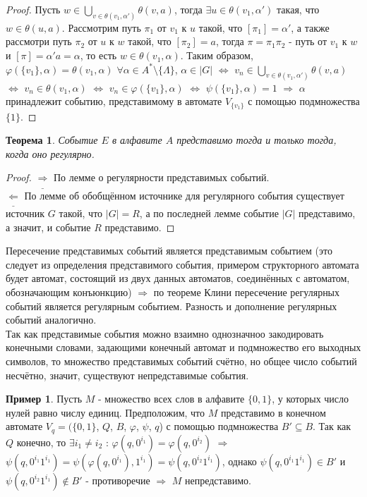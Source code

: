 \documentclass[a4paper, 12pt]{article}
\renewcommand{\phi}{\varphi}
\theoremstyle{definition}
\newtheorem*{example1}{Пример}
\theoremstyle{plain}
\newtheorem*{theorem}{Теорема}
\theoremstyle{remark}
\begin{document}
\begin{proof}
    Пусть $w\in\bigcup\limits_{v\in\theta(v_1,\alpha')}\theta(v,a)$, тогда $\exists u\in\theta(v_1,\alpha')$ такая, что $w\in\theta(u,a)$. Рассмотрим путь $\pi_1$ от $v_1$ к $u$ такой, что $[\pi_1]=\alpha'$, а также рассмотри путь $\pi_2$ от $u$ к $w$ такой, что $[\pi_2]=a$, тогда $\pi=\pi_1\pi_2$ - путь от $v_1$ к $w$ и $[\pi]=\alpha'a=\alpha$, то есть $w\in\theta(v_1,\alpha)$.
    Таким образом, $\phi(\{v_1\},\alpha)=\theta(v_1,\alpha)$ $\forall\alpha\in A^*\setminus\{\Lambda\}$, $\alpha\in|G|$ $\Leftrightarrow$ $v_n\in\bigcup\limits_{v\in\theta(v_1,\alpha')}\theta(v,a)$ $\Leftrightarrow$ $v_n\in\theta(v_1,\alpha)$ $\Leftrightarrow$ $v_n\in\phi(\{v_1\},\alpha)$ $\Leftrightarrow$ $\psi(\{v_1\},\alpha)=1$ $\Longrightarrow$ $\alpha$ принадлежит событию, представимому в автомате $V_{\{v_1\}}$ с помощью подмножества $\{1\}$.
  \end{proof}
  \begin{theorem}
    Событие $E$ в алфавите $A$ представимо тогда и только тогда, когда оно регулярно.
  \end{theorem}
  \begin{proof}
    $\underline{\Longrightarrow}$ По лемме о регулярности представимых событий.\\
    $\underline{\Longleftarrow}$ По лемме об обобщённом источнике для регулярного события существует источник $G$ такой, что $|G|=R$, а по последней лемме событие $|G|$ представимо, а значит, и событие $R$ представимо.
  \end{proof}
  Пересечение представимых событий является представимым событием (это следует из определения представимого события, примером структорного автомата будет автомат, состоящий из двух данных автоматов, соединённых с автоматом, обозначающим конъюнкцию) $\Longrightarrow$ по теореме Клини пересечение регулярных событий является регулярным событием. Разность и дополнение регулярных событий аналогично.\\
  Так как представимые события можно взаимно однозначноо закодировать конечными словами, задающими конечный автомат и подмножество его выходных символов, то множество представимых событий счётно, но общее число событий несчётно, значит, существуют непредставимые события.\\
  \begin{example1}
    Пусть $M$ - множество всех слов в алфавите $\{0,1\}$, у которых число нулей равно числу единиц. Предположим, что $M$ представимо в конечном автомате $V_q=(\{0,1\}$, $Q$, $B$, $\phi$, $\psi$, $q$) с помощью подмножества $B'\subseteq B$. Так как $Q$ конечно, то $\exists i_1\neq i_2$ : $\phi(q,0^{i_1})=\phi(q,0^{i_2})$ $\Longrightarrow$ $\psi(q,0^{i_1}1^{i_1})=\psi(\phi(q,0^{i_1}),1^{i_1})=\psi(q,0^{i_2}1^{i_1})$, однако $\psi(q,0^{i_1}1^{i_1})\in B'$ и $\psi(q,0^{i_2}1^{i_1})\notin B'$ - противоречие $\Longrightarrow$ $M$ непредставимо.
  \end{example1}
\end{document}
